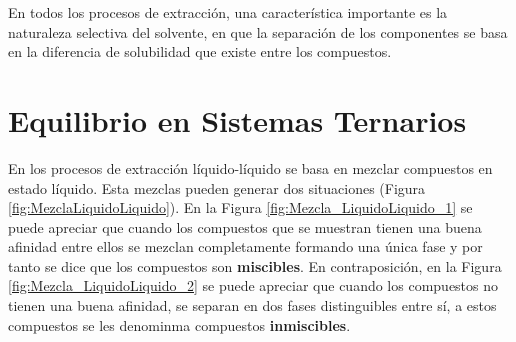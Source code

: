 \documentclass[11pt]{book}
\begin{document}
En todos los procesos de extracción, una característica importante es la naturaleza selectiva del solvente, en que la separación de los componentes se basa en la diferencia de solubilidad que existe entre los compuestos. 

\section{Equilibrio en Sistemas Ternarios}

En los procesos de extracción líquido-líquido se basa en mezclar compuestos en estado líquido. Esta mezclas pueden generar dos situaciones (Figura \ref{fig:MezclaLiquidoLiquido}). En la Figura \ref{fig:Mezcla_LiquidoLiquido_1} se puede apreciar que cuando los compuestos que se muestran tienen una buena afinidad entre ellos se mezclan completamente formando una única fase y por tanto se dice que los compuestos son \textbf{miscibles}. En contraposición, en la Figura \ref{fig:Mezcla_LiquidoLiquido_2} se puede apreciar que cuando los compuestos no tienen una buena afinidad, se separan en dos fases distinguibles entre sí, a estos compuestos se les denominma compuestos \textbf{inmiscibles}.
\end{document}
